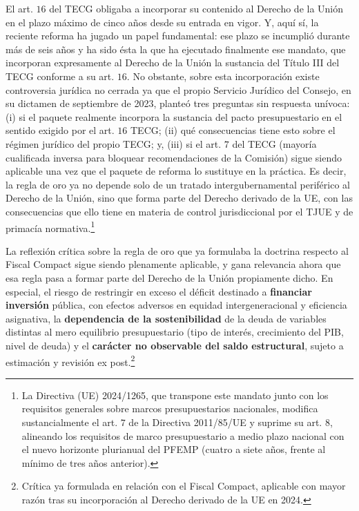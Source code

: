 \documentclass[10pt,a4paper]{article}
\begin{document}
El art. $16$ del TECG obligaba a incorporar su contenido al Derecho de la Unión en el plazo máximo de cinco años desde su entrada en vigor. Y, aquí sí, la reciente reforma ha jugado un papel fundamental: ese plazo se incumplió durante más de seis años y ha sido ésta la que ha ejecutado finalmente ese mandato, que incorporan expresamente al Derecho de la Unión la sustancia del Título III del TECG conforme a su art. $16$. No obstante, sobre esta incorporación existe controversia jurídica no cerrada ya que el propio Servicio Jurídico del Consejo, en su dictamen de septiembre de 2023, planteó tres preguntas sin respuesta unívoca: (i) si el paquete realmente incorpora la sustancia del pacto presupuestario en el sentido exigido por el art. $16$ TECG; (ii) qué consecuencias tiene esto sobre el régimen jurídico del propio TECG; y, (iii) si el art. $7$ del TECG (mayoría cualificada inversa para bloquear recomendaciones de la Comisión) sigue siendo aplicable una vez que el paquete de reforma lo sustituye en la práctica. Es decir, la regla de oro ya no depende solo de un tratado intergubernamental periférico al Derecho de la Unión, sino que forma parte del Derecho derivado de la UE, con las consecuencias que ello tiene en materia de control jurisdiccional por el TJUE y de primacía normativa.\footnote{%
    La Directiva (UE) 2024/1265, que transpone este mandato junto con los requisitos generales sobre marcos presupuestarios nacionales, modifica sustancialmente el art. $7$ de la Directiva 2011/85/UE y suprime su art. $8$, alineando los requisitos de marco presupuestario a medio plazo nacional con el nuevo horizonte plurianual del PFEMP (cuatro a siete años, frente al mínimo de tres años anterior).
}

La reflexión crítica sobre la regla de oro que ya formulaba la doctrina respecto al Fiscal Compact sigue siendo plenamente aplicable, y gana relevancia ahora que esa regla pasa a formar parte del Derecho de la Unión propiamente dicho. En especial, el riesgo de restringir en exceso el déficit destinado a \textbf{financiar inversión} pública, con efectos adversos en equidad intergeneracional y eficiencia asignativa, la \textbf{dependencia de la sostenibilidad} de la deuda de variables distintas al mero equilibrio presupuestario (tipo de interés, crecimiento del PIB, nivel de deuda) y el \textbf{carácter no observable del saldo estructural}, sujeto a estimación y revisión ex post.\footnote{%
    Crítica ya formulada en relación con el Fiscal Compact, aplicable con mayor razón tras su incorporación al Derecho derivado de la UE en 2024.
}
\end{document}
